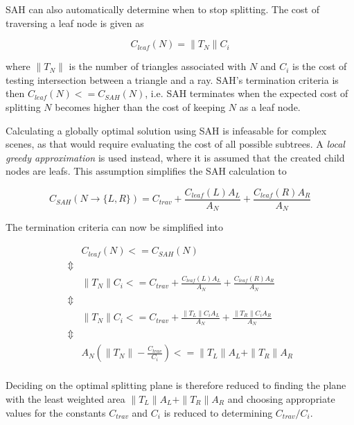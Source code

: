 
SAH can also automatically determine when to stop splitting. The cost
of traversing a leaf node is given as

\begin{displaymath}
  C_{leaf}(N) = \|T_N\| C_i
\end{displaymath}

where $\|T_N\|$ is the number of triangles associated with $N$ and $C_i$ is the
cost of testing intersection between a triangle and a ray. SAH's termination
criteria is then $C_{leaf}(N) <= C_{SAH}(N)$, i.e. SAH terminates when the
expected cost of splitting $N$ becomes higher than the cost of keeping $N$ as a
leaf node.

Calculating a globally optimal solution using SAH is infeasable for
complex scenes, as that would require evaluating the cost of all
possible subtrees. A \textit{local greedy approximation} is used
instead, where it is assumed that the created child nodes are
leafs. This assumption simplifies the SAH calculation to

\begin{displaymath}
  C_{SAH}(N \rightarrow \{L, R\}) = C_{trav} + \frac{C_{leaf}(L) A_L}{A_N}
  + \frac{C_{leaf}(R) A_R}{A_N}
\end{displaymath}

The termination criteria can now be simplified into

\begin{displaymath}
  \begin{array}{rl}
    & C_{leaf}(N) <= C_{SAH}(N)\\
    \Updownarrow \\
    & \|T_N\| C_i <= C_{trav} + \frac{C_{leaf}(L) A_L}{A_N} + \frac{C_{leaf}(R)
      A_R}{A_N} \\
    \Updownarrow \\
    & \|T_N\| C_i <= C_{trav} + \frac{\|T_L\| C_i A_L}{A_N} + \frac{\|T_R\| C_i A_R}{A_N}\\
    \Updownarrow \\
    & A_N (\|T_N\| - \frac{C_{trav}}{C_i}) <=  \|T_L\| A_L + \|T_R\| A_R\\
  \end{array}
\end{displaymath}

Deciding on the optimal splitting plane is therefore reduced to finding the
plane with the least weighted area $\|T_L\| A_L + \|T_R\| A_R$ and choosing
appropriate values for the constants $C_{trav}$ and $C_i$ is reduced to
determining $C_{trav}/C_i$.

